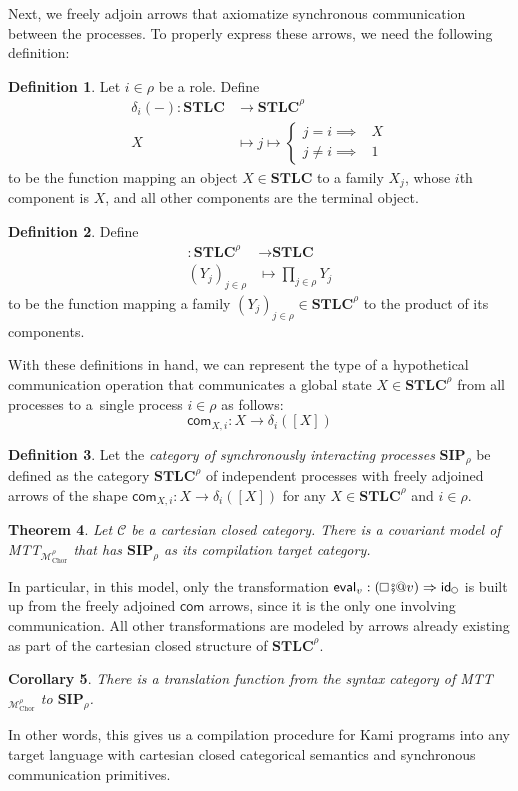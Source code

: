 \documentclass{scrartcl}
\renewcommand{\circle}{\mathop{\mathchoice%
  {\tikz{\draw (0,0) circle [radius=0.1cm];}}%
  {\tikz{\draw (0,0) circle [radius=0.1cm];}}%
  {\tikz{\draw (0,0) circle [radius=0.075cm];}}%
  {\tikz{\draw (0,0) circle [radius=0.05cm];}}}}
\renewcommand{\square}{\mathop{\mathchoice%
  {\tikz{\draw (0,0) rectangle (0.2cm,0.2cm);}}%
  {\tikz{\draw (0,0) rectangle (0.2cm,0.2cm);}}%
  {\tikz{\draw (0,0) rectangle (0.15cm,0.15cm);}}%
  {\tikz{\draw (0,0) rectangle (0.10cm,0.10cm);}}}}
\theoremstyle{definition}
\newtheorem{definition}{Definition}
\theoremstyle{plain}
\newtheorem{theorem}[definition]{Theorem}
\newtheorem{corollary}[definition]{Corollary}
\begin{document}
Next, we freely adjoin arrows that axiomatize synchronous communication between
the processes. To properly express these arrows, we need the following
definition:
\begin{definition}
  Let $i\in\rho$ be a role. Define
  \begin{align*}
    \delta_i({-}) : \textbf{STLC} &\to \textbf{STLC}^\rho \\
    X &\mapsto j \mapsto
    \begin{cases}
      j = i \implies &X\\
      j \neq i \implies &1
    \end{cases}
  \end{align*}
  to be the function mapping an object $X \in \textbf{STLC}$ to a family
  $X_j$, whose $i$th component is $X$, and all other components are the
  terminal object.
\end{definition}
\begin{definition} Define
  \begin{align*}
    [{-}] : \textbf{STLC}^\rho &\to \textbf{STLC} \\
    (Y_j)_{j\in\rho} &\mapsto \prod_{j \in \rho} Y_j
  \end{align*}
  to be the function mapping a family $(Y_j)_{j\in\rho} \in \textbf{STLC}^\rho$
  to the product of its components.
\end{definition}
With these definitions in hand, we can represent the type of a hypothetical
communication operation that communicates a global state $X \in
\textbf{STLC}^\rho$ from all processes to a~single process $i \in \rho$ as
follows:
\[
  \textsf{com}_{X,i} : X \to \delta_i([X])
\]
\begin{definition}
  Let the \emph{category of synchronously interacting processes}
  $\textbf{SIP}_{\rho}$ be
  defined as the category $\textbf{STLC}^\rho$ of independent processes with
  freely adjoined arrows of the shape $\textsf{com}_{X,i} : X \to
  \delta_i([X])$ for any $X \in \textbf{STLC}^\rho$ and $i \in \rho$.
\end{definition}
\begin{theorem}
  Let {\upshape$\mathcal{C}$} be a cartesian closed category. There is a
  covariant model of {\upshape MTT${}_{\mathcal{M}^\rho_{\textrm{Chor}}}$} that
  has {\upshape$\textbf{SIP}_{\rho}$} as its compilation target category.
\end{theorem}
In particular, in this model, only the transformation $\textsf{eval}_v :
(\square \fatsemi {}@ v) \Rightarrow \textsf{id}_{\circle}$ is built up from
the freely adjoined $\textsf{com}$ arrows, since it is the only one involving
communication. All other transformations are modeled by arrows already existing
as part of the cartesian closed structure of $\textbf{STLC}^\rho$.
\begin{corollary}
  There is a translation function from the syntax category of
  {\upshape MTT${}_{\mathcal{M}^\rho_{\textrm{Chor}}}$} to
  {\upshape$\textbf{SIP}_{\rho}$}.
\end{corollary}
In other words, this gives us a compilation procedure for Kami programs into
any target language with cartesian closed categorical semantics and synchronous
communication primitives.
\end{document}
